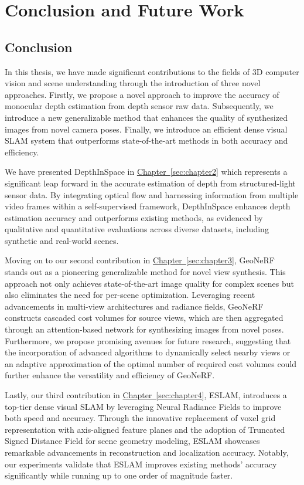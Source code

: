 \chapter{Conclusion and Future Work} \label{sec:chapter5}

\section{Conclusion}

In this thesis, we have made significant contributions to the fields of 3D computer vision and scene understanding through the introduction of three novel approaches. Firstly, we propose a novel approach to improve the accuracy of monocular depth estimation from depth sensor raw data. Subsequently, we introduce a new generalizable method that enhances the quality of synthesized images from novel camera poses. Finally, we introduce an efficient dense visual SLAM system that outperforms state-of-the-art methods in both accuracy and efficiency.

 We have presented DepthInSpace in \hyperref[sec:chapter2]{Chapter~\ref{sec:chapter2}} which represents a significant leap forward in the accurate estimation of depth from structured-light sensor data. By integrating optical flow and harnessing information from multiple video frames within a self-supervised framework, DepthInSpace enhances depth estimation accuracy and outperforms existing methods, as evidenced by qualitative and quantitative evaluations across diverse datasets, including synthetic and real-world scenes.

Moving on to our second contribution in \hyperref[sec:chapter3]{Chapter~\ref{sec:chapter3}}, GeoNeRF stands out as a pioneering generalizable method for novel view synthesis. This approach not only achieves state-of-the-art image quality for complex scenes but also eliminates the need for per-scene optimization. Leveraging recent advancements in multi-view architectures and radiance fields, GeoNeRF constructs cascaded cost volumes for source views, which are then aggregated through an attention-based network for synthesizing images from novel poses. Furthermore, we propose promising avenues for future research, suggesting that the incorporation of advanced algorithms to dynamically select nearby views or an adaptive approximation of the optimal number of required cost volumes could further enhance the versatility and efficiency of GeoNeRF.

Lastly, our third contribution in \hyperref[sec:chapter4]{Chapter~\ref{sec:chapter4}}, ESLAM, introduces a top-tier dense visual SLAM by leveraging Neural Radiance Fields to improve both speed and accuracy. Through the innovative replacement of voxel grid representation with axis-aligned feature planes and the adoption of Truncated Signed Distance Field for scene geometry modeling, ESLAM showcases remarkable advancements in reconstruction and localization accuracy. Notably, our experiments validate that ESLAM improves existing methods' accuracy significantly while running up to one order of magnitude faster.

